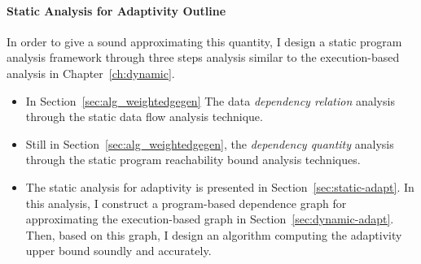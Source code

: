 \paragraph{{Static Analysis for Adaptivity Outline}}
In order to give a sound approximating this quantity, I design a static program analysis framework through three steps analysis
similar to the execution-based analysis in Chapter~\ref{ch:dynamic}.
\begin{itemize}
   \item In Section~\ref{sec:alg_weightedgegen}
   The data \emph{dependency relation} analysis through the static data flow analysis technique.
   \item Still in Section~\ref{sec:alg_weightedgegen}, the \emph{dependency quantity} analysis through the static program reachability bound analysis techniques.
   \item The static analysis for adaptivity is presented in Section~\ref{sec:static-adapt}.
   In this analysis, I construct a program-based dependence graph for approximating the execution-based graph in Section~\ref{sec:dynamic-adapt}.
   Then, based on this graph, I design an algorithm
   computing the adaptivity upper bound soundly 
   and accurately.
   \end{itemize}